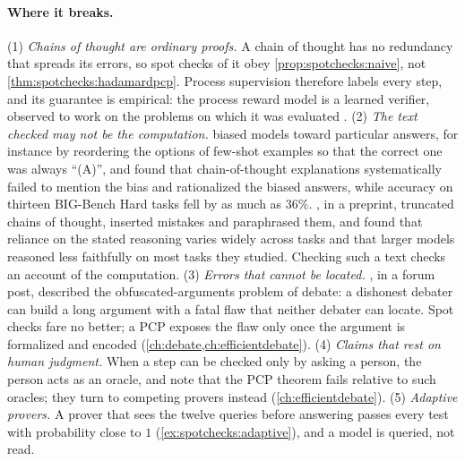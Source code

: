 \begin{refsection}
\paragraph{Where it breaks.} (1) \emph{Chains of thought are ordinary proofs.} A chain of thought has no redundancy that spreads its errors, so spot checks of it obey \cref{prop:spotchecks:naive}, not \cref{thm:spotchecks:hadamardpcp}. Process supervision therefore labels every step, and its guarantee is empirical: the process reward model is a learned verifier, observed to work on the problems on which it was evaluated \parencite{LightmanEtAl2024}. (2) \emph{The text checked may not be the computation.} \Textcite{TurpinEtAl2023} biased models toward particular answers, for instance by reordering the options of few-shot examples so that the correct one was always ``(A)'', and found that chain-of-thought explanations systematically failed to mention the bias and rationalized the biased answers, while accuracy on thirteen BIG-Bench Hard tasks fell by as much as $36\%$. \Textcite{LanhamEtAl2023}, in a preprint, truncated chains of thought, inserted mistakes and paraphrased them, and found that reliance on the stated reasoning varies widely across tasks and that larger models reasoned less faithfully on most tasks they studied. Checking such a text checks an account of the computation. (3) \emph{Errors that cannot be located.} \Textcite{Barnes2020}, in a forum post, described the obfuscated-arguments problem of debate: a dishonest debater can build a long argument with a fatal flaw that neither debater can locate. Spot checks fare no better; a PCP exposes the flaw only once the argument is formalized and encoded (\cref{ch:debate,ch:efficientdebate}). (4) \emph{Claims that rest on human judgment.} When a step can be checked only by asking a person, the person acts as an oracle, and \textcite{BrownCohenEtAl2024} note that the PCP theorem fails relative to such oracles; they turn to competing provers instead (\cref{ch:efficientdebate}). (5) \emph{Adaptive provers.} A prover that sees the twelve queries before answering passes every test with probability close to $1$ (\cref{ex:spotchecks:adaptive}), and a model is queried, not read.


\end{refsection}

